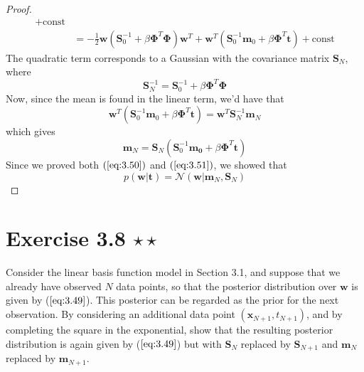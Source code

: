\begin{proof}
\begin{align*}
            + \text{const} \\
        &= -\frac{1}{2} \mathbf{w}(\mathbf{S}_0^{-1} + \beta \mathbf{\Phi}^T\mathbf{\Phi})\mathbf{w}^T
            + \mathbf{w}^T (\mathbf{S}_0^{-1}\mathbf{m}_0 + \beta\mathbf{\Phi}^T\mathbf{t})
            + \text{const}
    \end{align*}
    The quadratic term corresponds to a Gaussian with the covariance matrix $\mathbf{S}_N$, where
    \begin{equation}\label{eq:3.51}\tag{3.51}
        \mathbf{S}_N^{-1} = \mathbf{S}_0^{-1} + \beta \mathbf{\Phi}^T\mathbf{\Phi}
    \end{equation}
    Now, since the mean is found in the linear term, we'd have that
    \begin{equation*}
        \mathbf{w}^T(\mathbf{S}_0^{-1}\mathbf{m}_0 + \beta\mathbf{\Phi}^T\mathbf{t})
        = \mathbf{w}^T\mathbf{S}_N^{-1}\mathbf{m}_N
    \end{equation*}
    which gives
    \begin{equation}\label{eq:3.50}\tag{3.50}
        \mathbf{m}_N = \mathbf{S}_N(\mathbf{S}_0^{-1}\mathbf{m_0} + \beta\mathbf{\Phi}^T\mathbf{t})
    \end{equation}
    Since we proved both $(\ref{eq:3.50})$ and $(\ref{eq:3.51})$, we showed that
    \begin{equation}\label{eq:3.49}\tag{3.49}
        p(\mathbf{w} | \mathbf{t}) = \mathcal{N}(\mathbf{w} | \mathbf{m}_N, \mathbf{S}_N)
    \end{equation}
\end{proof}

\section*{Exercise 3.8 $\star \star$}
Consider the linear basis function model in Section 3.1, and suppose
that we already have observed $N$ data points, so that the posterior
distribution over $\mathbf{w}$ is given by ($\ref{eq:3.49}$). This posterior
can be regarded as the prior for the next observation. By considering an additional
data point $(\mathbf{x}_{N + 1}, t_{N + 1})$, and by completing the square in the
exponential, show that the resulting posterior distribution is again
given by ($\ref{eq:3.49}$) but with $\mathbf{S}_N$ replaced by $\mathbf{S}_{N + 1}$
and $\mathbf{m}_N$ replaced by $\mathbf{m}_{N + 1}$.

\vspace{1em}

